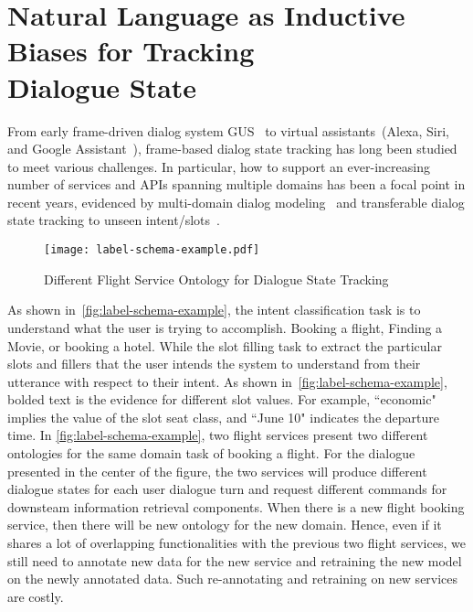 \chapter[Natural Language as Inductive Biases for Tracking \\Dialogue State]{Natural Language as Inductive \\Biases for Tracking \\Dialogue State}
\label{chap:sgd}

From early frame-driven dialog system GUS~\citep{bobrow1977gus} to
virtual assistants~(Alexa, Siri, and Google Assistant~\etal),
frame-based dialog state tracking has long been studied to meet
various challenges. In particular, how to support an ever-increasing
number of services and APIs spanning multiple domains has been a focal
point in recent years, evidenced by multi-domain dialog
modeling~\citep{budzianowski2018multiwoz,byrne2019taskmaster,
  shah-etal-2018-bootstrapping} and transferable dialog state tracking
to unseen intent/slots~\cite{mrkvsic2017neural,
  wu2019transferable, hosseini2020simple}.

\begin{figure}[!th]
\centering
\texttt{[image: label-schema-example.pdf]}
\caption{\label{fig:label-schema-example} Different Flight Service
  Ontology for Dialogue State Tracking}
\end{figure}

As shown in~\autoref{fig:label-schema-example}, the intent
classification task is to understand what the user is trying to
accomplish. Booking a flight, Finding a Movie, or booking a
hotel. While the slot filling task to extract the particular slots and
fillers that the user intends the system to understand from their
utterance with respect to their intent. As shown
in~\autoref{fig:label-schema-example}, bolded text is the evidence for
different slot values. For example, ``economic" implies the value of
the slot seat class, and ``June 10" indicates the departure time. In
\autoref{fig:label-schema-example}, two flight services present two
different ontologies for the same domain task of booking a flight. For
the dialogue presented in the center of the figure, the two services
will produce different dialogue states for each user dialogue turn and
request different commands for downsteam information retrieval
components. When there is a new flight booking service, then there
will be new ontology for the new domain. Hence, even if it shares a
lot of overlapping functionalities with the previous two flight
services, we still need to annotate new data for the new service and
retraining the new model on the newly annotated data. Such
re-annotating and retraining on new services are costly.

